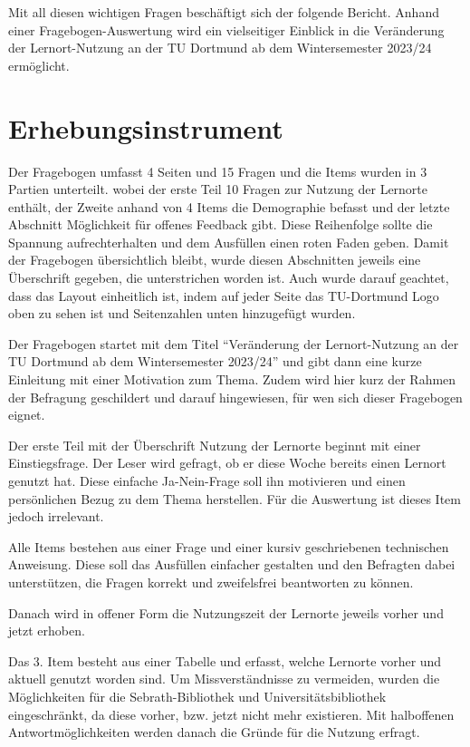 \documentclass[11pt, a4paper]{article}
\begin{document}
Mit all diesen wichtigen Fragen beschäftigt sich der folgende Bericht.
Anhand einer Fragebogen-Auswertung wird ein vielseitiger Einblick in die Veränderung der Lernort-Nutzung an der TU Dortmund ab dem Wintersemester 2023/24 ermöglicht.


\newpage
\section{Erhebungsinstrument}
\label{Erhebungsinstrument}
Der Fragebogen umfasst 4 Seiten und 15 Fragen und die Items wurden in 3 Partien unterteilt. wobei der erste Teil 10 Fragen zur Nutzung der Lernorte enthält, der Zweite anhand von 4 Items die Demographie befasst und der letzte Abschnitt Möglichkeit für offenes Feedback gibt.
Diese Reihenfolge sollte die Spannung aufrechterhalten und dem Ausfüllen einen roten Faden geben. 
Damit der Fragebogen übersichtlich bleibt, wurde diesen Abschnitten jeweils eine Überschrift gegeben, die unterstrichen worden ist.
Auch wurde darauf geachtet, dass das Layout einheitlich ist, indem auf jeder Seite das TU-Dortmund Logo oben zu sehen ist und Seitenzahlen unten hinzugefügt wurden.

Der Fragebogen startet mit dem Titel “Veränderung der Lernort-Nutzung an der TU Dortmund ab dem Wintersemester 2023/24” und gibt dann eine kurze Einleitung mit einer Motivation zum Thema. Zudem wird hier kurz der Rahmen der Befragung geschildert und darauf hingewiesen, für wen sich dieser Fragebogen eignet.

Der erste Teil mit der Überschrift Nutzung der Lernorte beginnt mit einer Einstiegsfrage.
Der Leser wird gefragt, ob er diese Woche bereits einen Lernort genutzt hat. Diese einfache Ja-Nein-Frage soll ihn motivieren und einen persönlichen Bezug zu dem Thema herstellen. Für die Auswertung ist dieses Item jedoch irrelevant.

Alle Items bestehen aus einer Frage und einer kursiv geschriebenen technischen Anweisung. Diese soll das Ausfüllen einfacher gestalten und den Befragten dabei unterstützen, die Fragen korrekt und zweifelsfrei beantworten zu können.

Danach wird in offener Form die Nutzungszeit der Lernorte jeweils vorher und jetzt erhoben. 

Das 3. Item besteht aus einer Tabelle und erfasst, welche Lernorte vorher und aktuell genutzt worden sind.
Um Missverständnisse zu vermeiden, wurden die Möglichkeiten für die Sebrath-Bibliothek und Universitätsbibliothek eingeschränkt, da diese vorher, bzw. jetzt nicht mehr existieren.
Mit halboffenen Antwortmöglichkeiten werden danach die Gründe für die Nutzung erfragt.
\end{document}

